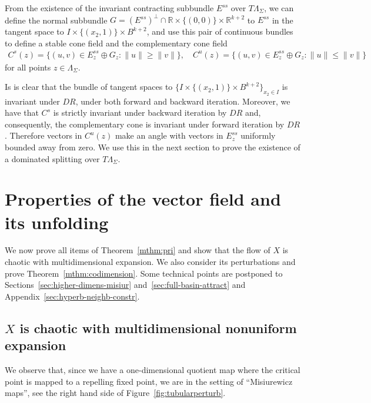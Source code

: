 \documentclass[reqno,12pt,a4paper]{amsart}
\theoremstyle{plain}
\theoremstyle{definition}
\begin{document}
From the existence of the invariant contracting subbundle
$E^{ss}$ over $T\Lambda_\Sigma$, we can define the normal
subbundle
$G=(E^{ss})^\perp\cap {{\mathbb R}}\times\{(0,0)\}\times{{\mathbb R}}^{k+2}$
to $E^{ss}$ in the tangent space to $I\times\{(x_2,1)\}\times B^{k+2}$,
and use this pair of continuous bundles to define a stable
cone field and the complementary cone field
\begin{align*}
  C^s(z)=\{(u,v)\in E^{ss}_z\oplus G_z : \|u\|\ge\|v\|\}
,\quad
  C^u(z)=\{(u,v)\in E^{ss}_z\oplus G_z : \|u\|\le\|v\|\}
\end{align*}
for all points $z\in\Lambda_\Sigma$. 

Is is clear that the bundle of tangent spaces to $\{I\times\{(x_2,1)\}\times
B^{k+2}\}_{x_2\in I}$ is invariant under $DR$, under both forward and
backward iteration. Moreover, we have that $C^s$ is strictly
invariant under backward iteration by $DR$ and,
consequently, the complementary cone is invariant under
forward iteration by $DR$. Therefore vectors in $C^u(z)$ make
an angle with vectors in $E^{ss}_z$ uniformly bounded away
from zero. We use this in the next section to prove the
existence of a dominated splitting over $T\Lambda_\Sigma$.

\section{Properties of the vector field and its unfolding}
\label{sec:conseq-unfold-x}

We now prove all items of Theorem~\ref{mthm:pri} and show
that the flow of $X$ is chaotic with multidimensional
expansion. We also consider its perturbations and prove
Theorem~\ref{mthm:codimension}. Some technical points are
postponed to Sections~\ref{sec:higher-dimens-misiur}
and~\ref{sec:full-basin-attract} and
Appendix~\ref{sec:hyperb-neighb-constr}.

\subsection{$X$ is chaotic with multidimensional nonuniform
  expansion}
\label{sec:x-chaotic-with}

We observe that, since we have a one-dimensional quotient
map where the critical point is mapped to a repelling fixed
point, we are in the setting of ``Misiurewicz maps'', see
the right hand side of Figure~\ref{fig:tubularperturb}.
\end{document}
